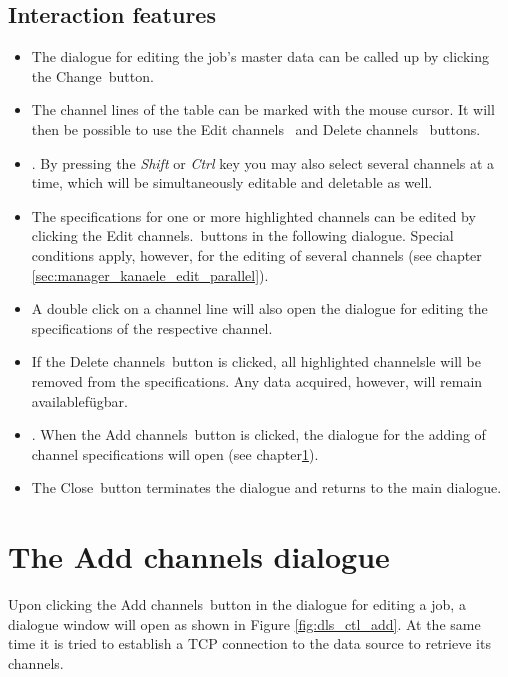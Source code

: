 \documentclass[a4paper,12pt,BCOR6mm,bibtotoc,idxtotoc]{scrbook}
\begin{document}

\subsection{Interaction features}

\begin{itemize} 
\item The dialogue for editing the job’s master data can be called up by clicking the \glqq Change\grqq\  button. 
\item The channel lines of the table can be marked with the mouse cursor. It will then be possible to use the \glqq Edit channels \grqq\ and \glqq Delete channels \grqq\  buttons.
\item. By pressing the \textit{Shift} or \textit{Ctrl} key you may also select several channels at a time, which will be simultaneously editable and deletable as well. 
\item The specifications for one or more highlighted channels can be edited by clicking the \glqq Edit channels.\grqq\ buttons in the following dialogue. Special conditions apply, however, for the editing of several channels (see chapter \ref{sec:manager_kanaele_edit_parallel}). 
\item A double click on a channel line will also open the dialogue for editing the specifications of the respective channel. 
\item If the \glqq Delete channels\grqq\  button is clicked, all highlighted channels\-le  will be removed from the specifications. Any data acquired, however, will remain available\-füg\-bar. 
\item. When the \glqq Add channels\grqq\  button is clicked, the dialogue for the adding of channel specifications will open (see chapter\ref{sec:manager_kanaele_hinzu}). 
\item The \glqq Close\grqq\ button terminates the dialogue and returns to the main dialogue. \end{itemize}


\section{The \glqq Add channels dialogue\grqq} \label{sec:manager_kanaele_hinzu}

Upon clicking the \glqq Add channels\grqq\ button in the dialogue for editing a job, a dialogue window will open as shown in Figure \ref{fig:dls_ctl_add}. At the same time it is tried to establish a TCP connection to the data source to retrieve its channels.
\end{document}
